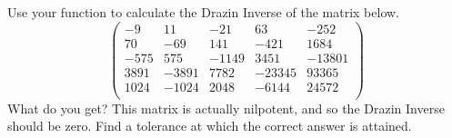 \begin{problem}
Use your function to calculate the Drazin Inverse of the matrix below.
\[                                                          
\begin{pmatrix}
-9&11&-21&63&-252 \\
70&-69&141&-421&1684 \\
-575&575&-1149&3451&-13801 \\
3891&-3891&7782&-23345&93365 \\
1024&-1024&2048&-6144&24572 \\
\end{pmatrix}
\]                                                           What do you get? This matrix is actually nilpotent, and so the Drazin Inverse should be zero. Find a tolerance at which the correct answer is attained.
\end{problem}





